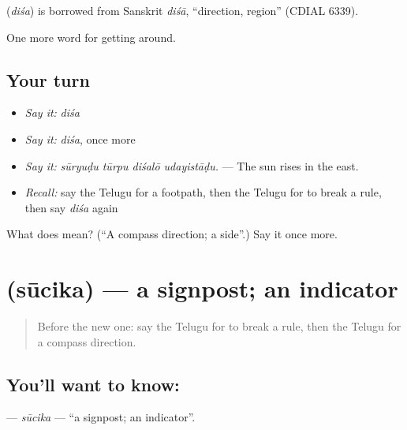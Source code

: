 \begin{cousinweb}
\textbf{} (\emph{diśa}) is borrowed from Sanskrit \emph{diśā}, \textquotedblleft{}direction, region\textquotedblright{} (CDIAL 6339).
\end{cousinweb}

\begin{grammarlens}[title={What you've built}]
One more word for getting around.
\end{grammarlens}

\subsection*{Your turn}
\begin{itemize}
\raggedright
  \item \emph{Say it:} \emph{diśa}
  \item \emph{Say it:} \emph{diśa}, once more
  \item \emph{Say it:} \emph{sūryuḍu tūrpu diśalō udayistāḍu.} — The sun rises in the east.
  \item \emph{Recall:} say the Telugu for a footpath, then the Telugu for to break a rule, then say \emph{diśa} again
\end{itemize}

\begin{tcolorbox}[breakable,colback=teal!4,colframe=teal!35!black,title={Before you move on}]
What does  mean? (\textquotedblleft{}A compass direction; a side\textquotedblright{}.) Say it once more.
\end{tcolorbox}
\section[\texorpdfstring{\te{సూచిక} (sūcika)}{సూచిక (sūcika)}]{ (sūcika) — a signpost; an indicator}

\label{lesson:TE-C448-sucika}



\begin{quote}
Before the new one: say the Telugu for to break a rule, then the Telugu for a compass direction.
\end{quote}

\subsection*{You'll want to know: }
\textbf{} — \emph{sūcika} — \textquotedblleft{}a signpost; an indicator\textquotedblright{}.

